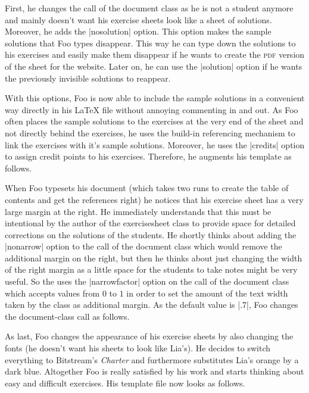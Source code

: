 \documentclass[a4paper,fleqn,9pt]{report}
\def\exercisesheet{{exercisesheet}}
\begin{document}
First, he changes the call of the document class as he is not a
student anymore and mainly doesn't want his exercise sheets look like
a sheet of solutions. Moreover, he adds the |nosolution|
option. This option makes the sample solutions that Foo types
disappear. This way he can type down the solutions to his exercises
and easily make them disappear if he wants to create the \textsc{pdf}
version of the sheet for the website. Later on, he can use the
|solution| option if he wants the previously invisible
solutions to reappear.



With this options, Foo is now able to include the sample solutions in
a convenient way directly in his \LaTeX{} file without annoying
commenting in and out. As Foo often places the sample solutions to the
exercises at the very end of the sheet and not directly behind the
exercises, he uses the build-in referencing mechanism to link the
exercises with it's sample solutions. Moreover, he uses the
|credits| option to assign credit points to his exercises.
Therefore, he augments his template as follows.



When Foo typesets his document (which takes two runs to create the
table of contents and get the references right) he notices that his
exercise sheet has a very large margin at the right. He immediately
understands that this must be intentional by the author of the
\exercisesheet{} class to provide space for detailed corrections on
the solutions of the students. He shortly thinks about adding the
|nonarrow| option to the call of the document class which
would remove the additional margin on the right, but then he thinks
about just changing the width of the right margin as a little space
for the students to take notes might be very useful. So the uses the
|narrowfactor| option on the call of the document class
which accepts values from $0$ to $1$ in order to set the amount of the
text width taken by the class as additional margin. As the default
value is |.7|, Foo changes the document-class call as
follows.



As last, Foo changes the appearance of his exercise sheets by also
changing the fonts (he doesn't want his sheets to look like Lia's). He
decides to switch everything to Bitstream's \emph{Charter} and
furthermore substitutes Lia's orange by a dark blue. Altogether Foo is
really satisfied by his work and starts thinking about easy and
difficult exercises. His template file now looks as follows.
\end{document}
